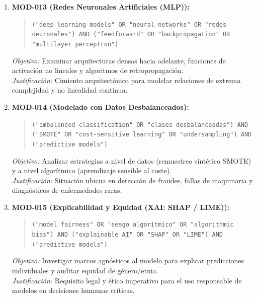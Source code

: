 \begin{enumerate}
  \textit{Justificación:} Esencial cuando el número de variables predictoras supera al número de observaciones (p > n).
  \item \textbf{MOD-013 (Redes Neuronales Artificiales (MLP)):}
  \begin{quote}
  \texttt{("deep learning models" OR "neural networks" OR "redes neuronales") AND ("feedforward" OR "backpropagation" OR "multilayer perceptron")}
  \end{quote}
  \textit{Objetivo:} Examinar arquitecturas densas hacia adelante, funciones de activación no lineales y algoritmos de retropropagación.\\
  \textit{Justificación:} Cimiento arquitectónico para modelar relaciones de extrema complejidad y no linealidad continua.
  \item \textbf{MOD-014 (Modelado con Datos Desbalanceados):}
  \begin{quote}
  \texttt{("imbalanced classification" OR "clases desbalanceadas") AND ("SMOTE" OR "cost-sensitive learning" OR "undersampling") AND ("predictive models")}
  \end{quote}
  \textit{Objetivo:} Analizar estrategias a nivel de datos (remuestreo sintético SMOTE) y a nivel algorítmico (aprendizaje sensible al coste).\\
  \textit{Justificación:} Situación ubicua en detección de fraudes, fallas de maquinaria y diagnósticos de enfermedades raras.
  \item \textbf{MOD-015 (Explicabilidad y Equidad (XAI: SHAP / LIME)):}
  \begin{quote}
  \texttt{("model fairness" OR "sesgo algorítmico" OR "algorithmic bias") AND ("explainable AI" OR "SHAP" OR "LIME") AND ("predictive models")}
  \end{quote}
  \textit{Objetivo:} Investigar marcos agnósticos al modelo para explicar predicciones individuales y auditar equidad de género/etnia.\\
  \textit{Justificación:} Requisito legal y ético imperativo para el uso responsable de modelos en decisiones humanas críticas.
\end{enumerate}


